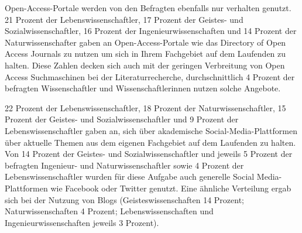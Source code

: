 Open-Access-Portale werden von den Befragten ebenfalls nur verhalten genutzt. 21 Prozent der Lebenswissenschaftler, 17 Prozent der Geistes- und Sozialwissenschaftler, 16 Prozent der Ingenieurwissenschaften und 14 Prozent der Naturwissenschafter gaben an Open-Access-Portale wie das Directory of Open Access Journals zu nutzen um sich in Ihrem Fachgebiet auf dem Laufenden zu halten. Diese Zahlen decken sich auch mit der geringen Verbreitung von Open Access Suchmaschinen bei der Literaturrecherche, durchschnittlich 4 Prozent der befragten Wissenschaftler und Wissenschaftlerinnen nutzen solche Angebote.

22 Prozent der Lebenswissenschaftler, 18 Prozent der Naturwissenschaftler, 15 Prozent der Geistes- und Sozialwissenschaftler und 9 Prozent der Lebenswissenschaftler gaben an, sich über akademische Social-Media-Plattformen über aktuelle Themen aus dem eigenen Fachgebiet auf dem Laufenden zu halten. Von 14 Prozent der Geistes- und Sozialwissenschaftler und jeweils 5 Prozent der befragten Ingenieur- und Naturwissenschaftler sowie 4 Prozent der Lebenswissenschaftler wurden für diese Aufgabe auch generelle Social Media-Plattformen wie Facebook oder Twitter genutzt. Eine ähnliche Verteilung ergab sich bei der Nutzung von Blogs (Geisteswissenschaften 14 Prozent; Naturwissenschaften 4 Prozent; Lebenswissenschaften und Ingenieurwissenschaften jeweils 3 Prozent).

